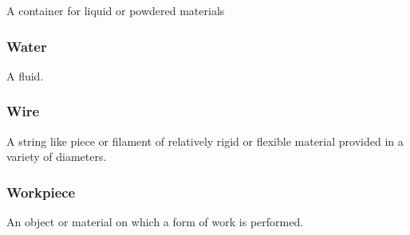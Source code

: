 A container for liquid or powdered materials

\FloatBarrier

\subsubsection{Water}
  \label{sec:Water}



A fluid.

\FloatBarrier

\subsubsection{Wire}
  \label{sec:Wire}



A string like piece or filament of relatively rigid or flexible material provided in a variety of diameters.

\FloatBarrier

\subsubsection{Workpiece}
  \label{sec:Workpiece}



An object or material on which a form of work is performed.

\FloatBarrier
